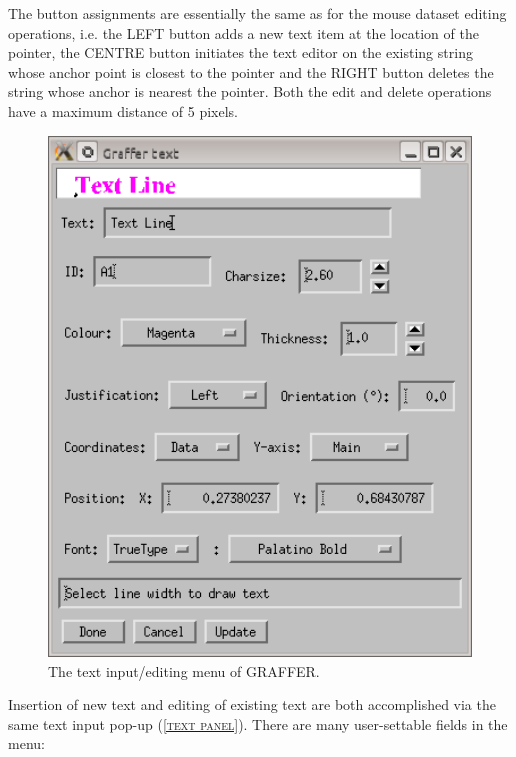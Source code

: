 \documentclass[11pt,twoside,english]{article}
\begin{document}
The button assignments are essentially the same as for the mouse
dataset editing operations, i.e. the LEFT button adds a new text item
at the location of the pointer, the CENTRE button initiates the text
editor on the existing string whose anchor point is closest to the
pointer and the RIGHT button deletes the string whose anchor is nearest
the pointer. Both the edit and delete operations have a maximum
distance of 5 pixels.
\begin{figure}[htbp]
  \centering
  \includegraphics[width=12cm]{text}
  \caption{The text input/editing menu of GRAFFER.}
  \label{text panel}
\end{figure}
Insertion of new text and editing of existing text are both
accomplished via the same text input pop-up (\textsc{\autoref{text
    panel}}). There are many user-settable fields in the menu:
\end{document}
